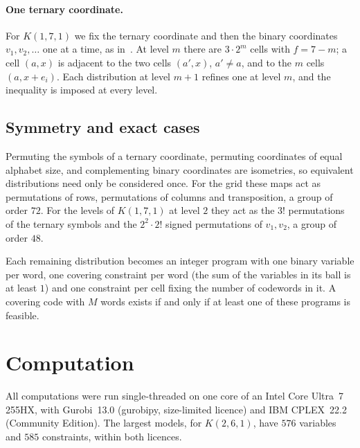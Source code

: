 \documentclass[11pt]{article}
\theoremstyle{remark}
\begin{document}
\paragraph{One ternary coordinate.} For $K(1,7,1)$ we fix the ternary coordinate and then the
binary coordinates $v_1,v_2,\dots$ one at a time, as in~\cite{ob}. At level $m$ there are $3\cdot
2^m$ cells with $f=7-m$; a cell $(a,x)$ is adjacent to the two cells $(a',x)$, $a'\neq a$, and to
the $m$ cells $(a,x+e_i)$. Each distribution at level $m+1$ refines one at level $m$, and the
inequality is imposed at every level.

\subsection{Symmetry and exact cases}

Permuting the symbols of a ternary coordinate, permuting coordinates of equal alphabet size, and
complementing binary coordinates are isometries, so equivalent distributions need only be
considered once. For the grid these maps act as permutations of rows, permutations of columns and
transposition, a group of order $72$. For the levels of $K(1,7,1)$ at level $2$ they act as the
$3!$ permutations of the ternary symbols and the $2^2\cdot 2!$ signed permutations of $v_1,v_2$,
a group of order $48$.

Each remaining distribution becomes an integer program with one binary variable per word, one
covering constraint per word (the sum of the variables in its ball is at least $1$) and one
constraint per cell fixing the number of codewords in it. A covering code with $M$ words exists
if and only if at least one of these programs is feasible.

\section{Computation}

All computations were run single-threaded on one core of an Intel Core Ultra~7 255HX, with
Gurobi~13.0 (gurobipy, size-limited licence) and IBM CPLEX~22.2 (Community Edition). The largest
models, for $K(2,6,1)$, have $576$ variables and $585$ constraints, within both licences.
\end{document}
